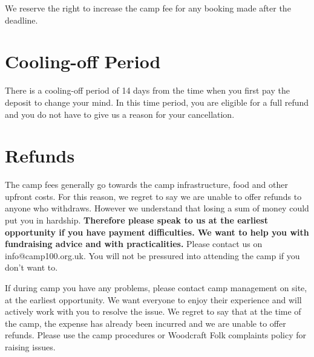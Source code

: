 \documentclass[a4paper, 11pt]{report}
\begin{document}
We reserve the right to increase the camp fee for any booking made after the deadline.

\section{Cooling-off Period}
There is a cooling-off period of 14 days from the time when you first pay the deposit to change your mind. In this time period, you are eligible for a full refund and you do not have to give us a reason for your cancellation. 

\section{Refunds}
The camp fees generally go towards the camp infrastructure, food and other upfront costs.  For this reason, we regret to say we are unable to offer refunds to anyone who withdraws. However we understand that losing a sum of money could put you in hardship. \textbf{Therefore please speak to us at the earliest opportunity if you have payment difficulties. We want to help you with fundraising advice and with practicalities.} Please contact us on info@camp100.org.uk. You will not be pressured into attending the camp if you don't want to.
 
If during camp you have any problems, please contact camp management on site, at the earliest opportunity. We want everyone to enjoy their experience and will actively work with you to resolve the issue. We regret to say that at the time of the camp, the expense has already been incurred and we are unable to offer refunds. Please use the camp procedures or Woodcraft Folk complaints policy for raising issues.


\makedocumentbackpage
\end{document}
